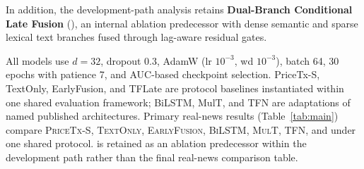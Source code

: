 In addition, the development-path analysis retains \textbf{Dual-Branch Conditional Late Fusion} (\DualBranch{}), an internal ablation predecessor with dense semantic and sparse lexical text branches fused through lag-aware residual gates.

All models use $d{=}32$, dropout 0.3, AdamW (lr $10^{-3}$, wd $10^{-3}$), batch 64, 30 epochs with patience 7, and AUC-based checkpoint selection.
PriceTx-S, TextOnly, EarlyFusion, and TFLate are protocol baselines instantiated within one shared evaluation framework; BiLSTM, MulT, and TFN are adaptations of named published architectures.
Primary real-news results (Table~\ref{tab:main}) compare \textsc{PriceTx-S}, \textsc{TextOnly}, \textsc{EarlyFusion}, \textsc{BiLSTM}, \textsc{MulT}, \textsc{TFN}, and \CGCMA{} under one shared protocol.
\DualBranch{} is retained as an ablation predecessor within the development path rather than the final real-news comparison table.
